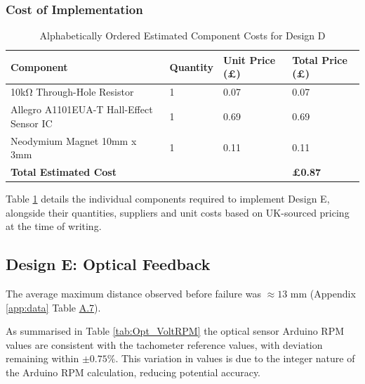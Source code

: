 \subsubsection{Cost of Implementation}

\begin{table}[H]
\centering
\caption{Alphabetically Ordered Estimated Component Costs for Design D}
\label{tab:design_d_cost}
\begin{tabularx}{\linewidth}{|l|X|X|X|}
\hline
\textbf{Component} & \textbf{Quantity} & \textbf{Unit Price (£)} & \textbf{Total Price (£)}\\ \hline
10kΩ Through-Hole Resistor \cite{rs_10kresistor}& 1 & 0.07 & 0.07\\ \hline
Allegro A1101EUA-T Hall-Effect Sensor IC \cite{MicroSystems_2016}& 1 & 0.69 & 0.69\\ \hline
Neodymium Magnet 10mm x 3mm \cite{RS_2192257} & 1 & 0.11 & 0.11\\ \hline\hline
\textbf{Total Estimated Cost} & & & \textbf{£0.87}\\ \hline
\end{tabularx}
\end{table}

Table \ref{tab:design_d_cost} details the individual components required to implement Design E, alongside their quantities, suppliers and unit costs based on UK-sourced pricing at the time of writing.

\newpage
\subsection{Design E: Optical Feedback}
The average maximum distance observed before failure was \(\approx13\) mm (Appendix \ref{app:data} Table \hyperref[tab:A.7]{A.7}).

As summarised in Table \ref{tab:Opt_VoltRPM} the optical sensor Arduino RPM values are consistent with the tachometer reference values, with deviation remaining within \(\pm 0.75\%\). This variation in values is due to the integer nature of the Arduino RPM calculation, reducing potential accuracy.

